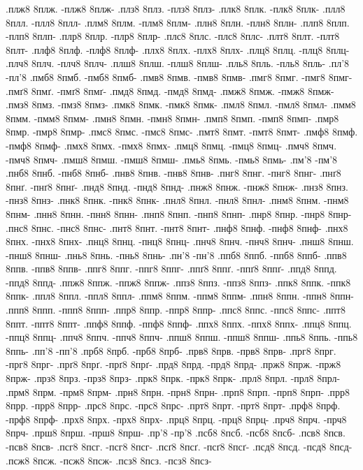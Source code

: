 {.плж8 8плж. -плж8 8плж-
.плз8 8плз. -плз8 8плз-
.плк8 8плк. -плк8 8плк-
.плл8 8плл. -плл8 8плл-
.плм8 8плм. -плм8 8плм-
.плн8 8плн. -плн8 8плн-
.плп8 8плп. -плп8 8плп-
.плр8 8плр. -плр8 8плр-
.плс8 8плс. -плс8 8плс-
.плт8 8плт. -плт8 8плт-
.плф8 8плф. -плф8 8плф-
.плх8 8плх. -плх8 8плх-
.плц8 8плц. -плц8 8плц-
.плч8 8плч. -плч8 8плч-
.плш8 8плш. -плш8 8плш-
.пль8 8пль. -пль8 8пль-
.пл'8 -пл'8
.пмб8 8пмб. -пмб8 8пмб-
.пмв8 8пмв. -пмв8 8пмв-
.пмг8 8пмг. -пмг8 8пмг-
.пмґ8 8пмґ. -пмґ8 8пмґ-
.пмд8 8пмд. -пмд8 8пмд-
.пмж8 8пмж. -пмж8 8пмж-
.пмз8 8пмз. -пмз8 8пмз-
.пмк8 8пмк. -пмк8 8пмк-
.пмл8 8пмл. -пмл8 8пмл-
.пмм8 8пмм. -пмм8 8пмм-
.пмн8 8пмн. -пмн8 8пмн-
.пмп8 8пмп. -пмп8 8пмп-
.пмр8 8пмр. -пмр8 8пмр-
.пмс8 8пмс. -пмс8 8пмс-
.пмт8 8пмт. -пмт8 8пмт-
.пмф8 8пмф. -пмф8 8пмф-
.пмх8 8пмх. -пмх8 8пмх-
.пмц8 8пмц. -пмц8 8пмц-
.пмч8 8пмч. -пмч8 8пмч-
.пмш8 8пмш. -пмш8 8пмш-
.пмь8 8пмь. -пмь8 8пмь-
.пм'8 -пм'8
.пнб8 8пнб. -пнб8 8пнб-
.пнв8 8пнв. -пнв8 8пнв-
.пнг8 8пнг. -пнг8 8пнг-
.пнґ8 8пнґ. -пнґ8 8пнґ-
.пнд8 8пнд. -пнд8 8пнд-
.пнж8 8пнж. -пнж8 8пнж-
.пнз8 8пнз. -пнз8 8пнз-
.пнк8 8пнк. -пнк8 8пнк-
.пнл8 8пнл. -пнл8 8пнл-
.пнм8 8пнм. -пнм8 8пнм-
.пнн8 8пнн. -пнн8 8пнн-
.пнп8 8пнп. -пнп8 8пнп-
.пнр8 8пнр. -пнр8 8пнр-
.пнс8 8пнс. -пнс8 8пнс-
.пнт8 8пнт. -пнт8 8пнт-
.пнф8 8пнф. -пнф8 8пнф-
.пнх8 8пнх. -пнх8 8пнх-
.пнц8 8пнц. -пнц8 8пнц-
.пнч8 8пнч. -пнч8 8пнч-
.пнш8 8пнш. -пнш8 8пнш-
.пнь8 8пнь. -пнь8 8пнь-
.пн'8 -пн'8
.ппб8 8ппб. -ппб8 8ппб-
.ппв8 8ппв. -ппв8 8ппв-
.ппг8 8ппг. -ппг8 8ппг-
.ппґ8 8ппґ. -ппґ8 8ппґ-
.ппд8 8ппд. -ппд8 8ппд-
.ппж8 8ппж. -ппж8 8ппж-
.ппз8 8ппз. -ппз8 8ппз-
.ппк8 8ппк. -ппк8 8ппк-
.ппл8 8ппл. -ппл8 8ппл-
.ппм8 8ппм. -ппм8 8ппм-
.ппн8 8ппн. -ппн8 8ппн-
.ппп8 8ппп. -ппп8 8ппп-
.ппр8 8ппр. -ппр8 8ппр-
.ппс8 8ппс. -ппс8 8ппс-
.ппт8 8ппт. -ппт8 8ппт-
.ппф8 8ппф. -ппф8 8ппф-
.ппх8 8ппх. -ппх8 8ппх-
.ппц8 8ппц. -ппц8 8ппц-
.ппч8 8ппч. -ппч8 8ппч-
.ппш8 8ппш. -ппш8 8ппш-
.ппь8 8ппь. -ппь8 8ппь-
.пп'8 -пп'8
.прб8 8прб. -прб8 8прб-
.прв8 8прв. -прв8 8прв-
.прг8 8прг. -прг8 8прг-
.прґ8 8прґ. -прґ8 8прґ-
.прд8 8прд. -прд8 8прд-
.прж8 8прж. -прж8 8прж-
.прз8 8прз. -прз8 8прз-
.прк8 8прк. -прк8 8прк-
.прл8 8прл. -прл8 8прл-
.прм8 8прм. -прм8 8прм-
.прн8 8прн. -прн8 8прн-
.прп8 8прп. -прп8 8прп-
.прр8 8прр. -прр8 8прр-
.прс8 8прс. -прс8 8прс-
.прт8 8прт. -прт8 8прт-
.прф8 8прф. -прф8 8прф-
.прх8 8прх. -прх8 8прх-
.прц8 8прц. -прц8 8прц-
.прч8 8прч. -прч8 8прч-
.прш8 8прш. -прш8 8прш-
.пр'8 -пр'8
.псб8 8псб. -псб8 8псб-
.псв8 8псв. -псв8 8псв-
.псг8 8псг. -псг8 8псг-
.псґ8 8псґ. -псґ8 8псґ-
.псд8 8псд. -псд8 8псд-
.псж8 8псж. -псж8 8псж-
.псз8 8псз. -псз8 8псз-
}
